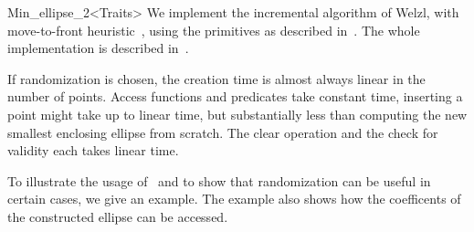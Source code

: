 \begin{ccRefClass}{Min_ellipse_2<Traits>}
We implement the incremental algorithm of Welzl, with move-to-front
heuristic~\cite{w-sedbe-91a}, using the primitives as described
in~\cite{gs-epsee-97,cgal:gs-seefe-97a}. The whole implementation is described
in~\cite{cgal:gs-seeeg-98}.

If randomization is
chosen, the creation time is almost always linear in the number of points.
Access functions and predicates take constant time, inserting a point might
take up to linear time, but substantially less than computing the new
smallest enclosing ellipse from scratch. The clear operation and the check
for validity each takes linear time.

\ccExample
{}

To illustrate the usage of \ccRefName\ and to show that randomization
can be useful in certain cases, we give an example. The example also
shows how the coefficents of the constructed ellipse can be accessed. 



\ccRestoreThreeColumns

\end{ccRefClass}


